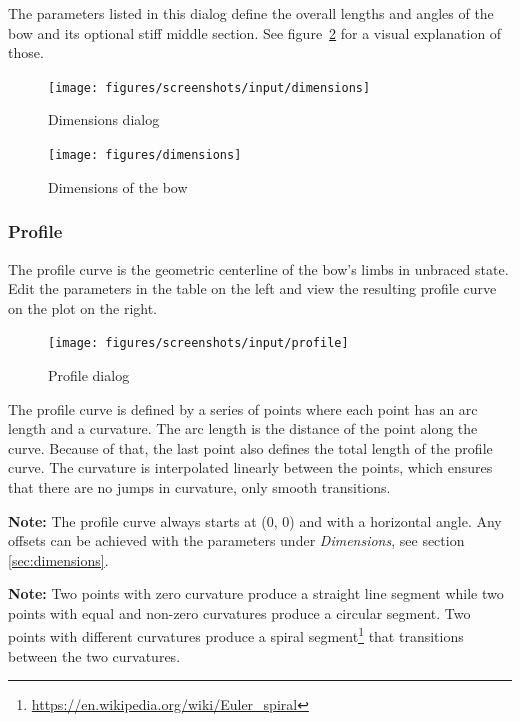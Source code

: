 \documentclass[12pt]{article}
\begin{document}
The parameters listed in this dialog define the overall lengths and angles of the bow and its optional stiff middle section. See figure~\ref{fig:dimensions-2} for a visual explanation of those.
\bigskip

\begin{figure}[H]
\centering
\texttt{[image: figures/screenshots/input/dimensions]}
\caption{Dimensions dialog}
\label{fig:dimensions-1}
\end{figure}

\begin{figure}[H]
\centering
\texttt{[image: figures/dimensions]}
\caption{Dimensions of the bow}
\label{fig:dimensions-2}
\end{figure}

\newpage
\subsubsection{Profile}

The profile curve is the geometric centerline of the bow's limbs in unbraced state.
Edit the parameters in the table on the left and view the resulting profile curve on the plot on the right.

\bigskip

\begin{figure}[H]
\centering
\texttt{[image: figures/screenshots/input/profile]}
\caption{Profile dialog}
\label{fig:profile}
\end{figure}

The profile curve is defined by a series of points where each point has an arc length and a curvature.
The arc length is the distance of the point along the curve.
Because of that, the last point also defines the total length of the profile curve.
The curvature is interpolated linearly between the points, which ensures that there are no jumps in curvature, only smooth transitions.

\bigskip

\textbf{Note:} The profile curve always starts at (0, 0) and with a horizontal angle.
Any offsets can be achieved with the parameters under \textit{Dimensions}, see section \ref{sec:dimensions}.

\bigskip

\textbf{Note:} Two points with zero curvature produce a straight line segment while two points with equal and non-zero curvatures produce a circular segment. Two points with different curvatures produce a spiral segment\footnote{\url{https://en.wikipedia.org/wiki/Euler_spiral}} that transitions between the two curvatures.
\end{document}
